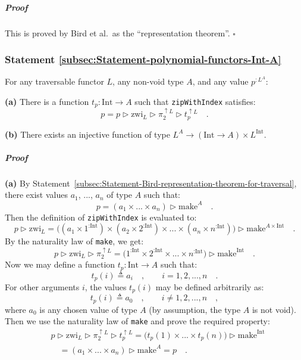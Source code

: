 \subparagraph{Proof}

This is proved by Bird et al.~as the \textsf{``}representation theorem\textsf{''}.
$\square$

\subsubsection{Statement \label{subsec:Statement-polynomial-functors-Int-A}\ref{subsec:Statement-polynomial-functors-Int-A}}

For any traversable functor $L$, any non-void type $A$, and any
value $p^{:L^{A}}$:

\textbf{(a)} There is a function $t_{p}:\text{Int}\rightarrow A$
such that \lstinline!zipWithIndex! satisfies:
\[
p=p\triangleright\text{zwi}_{L}\triangleright\pi_{2}^{\uparrow L}\triangleright t_{p}^{\uparrow L}\quad.
\]

\textbf{(b)} There exists an injective function of type $L^{A}\rightarrow(\text{Int}\rightarrow A)\times L^{\text{Int}}$.

\subparagraph{Proof}

\textbf{(a)} By Statement~\ref{subsec:Statement-Bird-representation-theorem-for-traversal},
there exist values $a_{1}$, ..., $a_{n}$ of type $A$ such that:
\[
p=(a_{1}\times...\times a_{n})\triangleright\text{make}^{A}\quad.
\]
Then the definition of \lstinline!zipWithIndex! is evaluated to:
\[
p\triangleright\text{zwi}_{L}=\big((a_{1}\times1^{:\text{Int}})\times(a_{2}\times2^{:\text{Int}})\times...\times(a_{n}\times n^{:\text{Int}})\big)\triangleright\text{make}^{A\times\text{Int}}\quad.
\]
By the naturality law of \lstinline!make!, we get:
\[
p\triangleright\text{zwi}_{L}\triangleright\pi_{2}^{\uparrow L}=\big(1^{:\text{Int}}\times2^{:\text{Int}}\times...\times n^{:\text{Int}}\big)\triangleright\text{make}^{\text{Int}}\quad.
\]
Now we may define a function $t_{p}:\text{Int}\rightarrow A$ such
that:
\[
t_{p}(i)\triangleq a_{i}\quad,\quad\quad i=1,2,...,n\quad.
\]
For other arguments $i$, the values $t_{p}(i)$ may be defined arbitrarily
as: 
\[
t_{p}(i)\triangleq a_{0}\quad,\quad\quad i\neq1,2,...,n\quad,
\]
where $a_{0}$ is any chosen value of type $A$ (by assumption, the
type $A$ is not void). Then we use the naturality law of \lstinline!make!
and prove the required property:
\begin{align*}
 & p\triangleright\text{zwi}_{L}\triangleright\pi_{2}^{\uparrow L}\triangleright t_{p}^{\uparrow L}=\big(t_{p}(1)\times...\times t_{p}(n)\big)\triangleright\text{make}^{\text{Int}}\\
 & \quad=(a_{1}\times...\times a_{n})\triangleright\text{make}^{A}=p\quad.
\end{align*}

